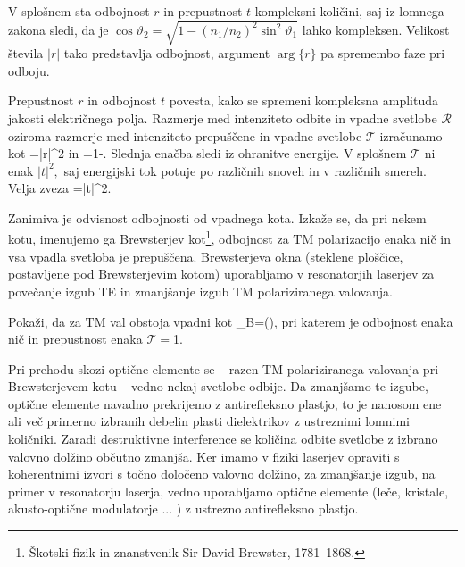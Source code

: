 V splošnem sta odbojnost $r$ in prepustnost $t$ kompleksni
količini, saj iz lomnega zakona sledi, da je $\cos\vartheta_{2}=
\sqrt{1-\left(n_{1}/n_{2}\right)^{2}\sin^{2}\vartheta_{1}}$
lahko kompleksen. Velikost števila $\left|r\right|$ tako predstavlja
odbojnost, argument $\arg\{r\}$ pa spremembo faze
pri odboju.

Prepustnost $r$ in odbojnost $t$ povesta, kako se spremeni kompleksna
amplituda jakosti električnega polja. Razmerje med intenziteto odbite
in vpadne svetlobe $\mathcal{R}$ oziroma razmerje med intenziteto prepuščene in vpadne svetlobe
$\mathcal{T}$ izračunamo kot 
\beq
{}=\left|r\right|^{2}
\eeq
in
\beq
{}=1-.
\eeq
Slednja enačba sledi iz ohranitve energije. V splošnem $\mathcal{T}$
ni enak $\left|t\right|^{2},$ saj energijski tok potuje po različnih
snoveh in v različnih smereh. Velja zveza
\beq
{}=\left|t\right|^{2}.
\eeq

Zanimiva je odvisnost odbojnosti od vpadnega kota. Izkaže se, da pri nekem kotu, 
imenujemo ga Brewsterjev kot\footnote{Škotski fizik in znanstvenik Sir David Brewster, 1781--1868.}, 
odbojnost za TM polarizacijo enaka nič in vsa vpadla
svetloba je prepuščena. Brewsterjeva
okna (steklene ploščice, postavljene pod Brewsterjevim kotom) uporabljamo
v resonatorjih laserjev za povečanje izgub TE in zmanjšanje izgub
TM polariziranega valovanja.

\begin{definition}
Pokaži, da za TM val obstoja vpadni kot
\beq
\vartheta_{B}=\arctan\left(\right),
\eeq
pri katerem je odbojnost enaka nič in prepustnost enaka $\mathcal{T}=$1.
\end{definition}

\begin{remark}
Pri prehodu skozi optične elemente se --
razen TM polariziranega valovanja pri Brewsterjevem 
kotu -- vedno nekaj
svetlobe odbije. Da zmanjšamo te izgube, optične elemente navadno
prekrijemo z antirefleksno plastjo, to je nanosom ene ali več primerno
izbranih debelin plasti dielektrikov z ustreznimi lomnimi količniki.
Zaradi destruktivne interference se količina odbite svetlobe z izbrano
valovno dolžino občutno zmanjša. Ker imamo v fiziki laserjev opraviti
s koherentnimi izvori s točno določeno valovno dolžino, za zmanjšanje
izgub, na primer v resonatorju laserja, vedno uporabljamo optične
elemente (leče, kristale, akusto-optične modulatorje ... ) z ustrezno
antirefleksno plastjo.
\end{remark}


